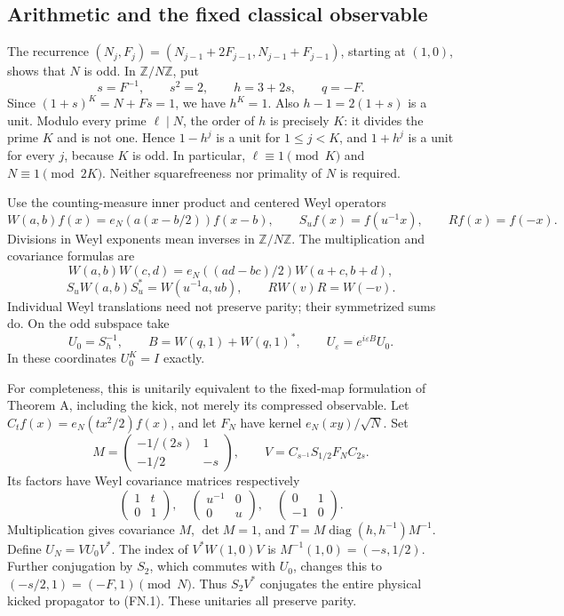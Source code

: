 \subsection{Arithmetic and the fixed classical observable}\label{floquet:arithmetic-and-the-fixed-classical-observable}

The recurrence \((N_j,F_j)=(N_{j-1}+2F_{j-1},N_{j-1}+F_{j-1})\), starting at \((1,0)\), shows that \(N\) is odd. In \(\mathbb Z/N\mathbb Z\), put \[
 s=F^{-1},\qquad s^2=2,\qquad h=3+2s,\qquad q=-F.
\] Since \((1+s)^K=N+Fs=1\), we have \(h^K=1\). Also \(h-1=2(1+s)\) is a unit. Modulo every prime \(\ell\mid N\), the order of \(h\) is precisely \(K\): it divides the prime \(K\) and is not one. Hence \(1-h^j\) is a unit for \(1\leq j<K\), and \(1+h^j\) is a unit for every \(j\), because \(K\) is odd. In particular, \(\ell\equiv1\pmod K\) and \(N\equiv1\pmod{2K}\). Neither squarefreeness nor primality of \(N\) is required.

Use the counting-measure inner product and centered Weyl operators \[
 W(a,b)f(x)=e_N(a(x-b/2))f(x-b),\qquad
 S_u f(x)=f(u^{-1}x),\qquad Rf(x)=f(-x).
\] Divisions in Weyl exponents mean inverses in \(\mathbb Z/N\mathbb Z\). The multiplication and covariance formulas are \[
 W(a,b)W(c,d)=e_N((ad-bc)/2)W(a+c,b+d),
\] \[
 S_uW(a,b)S_u^*=W(u^{-1}a,ub),\qquad RW(v)R=W(-v).
\] Individual Weyl translations need not preserve parity; their symmetrized sums do. On the odd subspace take \[
 U_0=S_h^{-1},\qquad B=W(q,1)+W(q,1)^*,\qquad
 U_\varepsilon=e^{i\varepsilon B}U_0.                            \tag{FN.1}
\] In these coordinates \(U_0^K=I\) exactly.

For completeness, this is unitarily equivalent to the fixed-map formulation of Theorem A, including the kick, not merely its compressed observable. Let \(C_tf(x)=e_N(tx^2/2)f(x)\), and let \(F_N\) have kernel \(e_N(xy)/\sqrt N\). Set \[
 M=\begin{pmatrix}-1/(2s)&1\\-1/2&-s\end{pmatrix},\qquad
 V=C_{s^{-1}}S_{1/2}F_N C_{2s}.
\] Its factors have Weyl covariance matrices respectively \[
 \begin{pmatrix}1&t\\0&1\end{pmatrix},\quad
 \begin{pmatrix}u^{-1}&0\\0&u\end{pmatrix},\quad
 \begin{pmatrix}0&1\\-1&0\end{pmatrix}.
\] Multiplication gives covariance \(M\), \(\det M=1\), and \(T=M\operatorname{diag}(h,h^{-1})M^{-1}\). Define \(U_N=VU_0V^*\). The index of \(V^*W(1,0)V\) is \(M^{-1}(1,0)=(-s,1/2)\). Further conjugation by \(S_2\), which commutes with \(U_0\), changes this to \((-s/2,1)=(-F,1)\pmod N\). Thus \(S_2V^*\) conjugates the entire physical kicked propagator to (FN.1). These unitaries all preserve parity.

